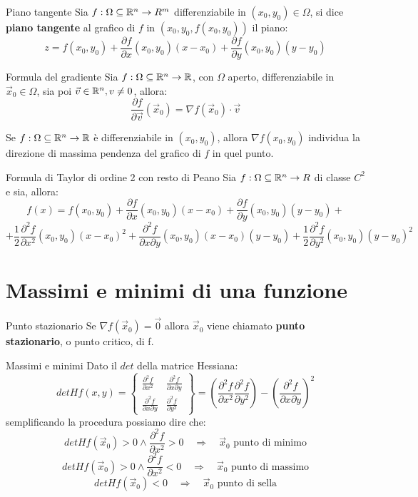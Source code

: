	\begin{definizione}{Piano tangente}
	Sia $f:\Omega \subseteq \mathbb{R}^n \rightarrow R^m$ differenziabile in $(x_0,y_0) \in \Omega$, si dice \textbf{piano tangente} al grafico di $f$ in $(x_0,y_0,f(x_0,y_0))$ il piano:
	$$z=f(x_0,y_0)+\frac{\partial f}{\partial x}(x_0,y_0)(x-x_0)+\frac{\partial f}{\partial y}(x_0,y_0)(y-y_0)$$
  \end{definizione}
	\begin{teorema}{Formula del gradiente}
	Sia $f:\Omega \subseteq \mathbb{R}^n \rightarrow \mathbb{R}$, con $\Omega$ aperto, differenziabile in $\vec x_0 \in \Omega$, sia poi $\vec v \in \mathbb{R}^n, v \ne 0$, allora:
	$$\frac{\partial f}{\partial \vec v}(\vec x_0) = \nabla f(\vec x_0) \cdot \vec v$$
  \end{teorema}
	\begin{teorema}
	Se $f:\Omega \subseteq \mathbb{R}^n \rightarrow \mathbb{R}$ è differenziabile in $(x_0, y_0)$, allora $\nabla f(x_0, y_0)$ individua la direzione di massima pendenza del grafico di $f$ in quel punto.
  \end{teorema}
	\begin{teorema}{Formula di Taylor di ordine 2  con resto di Peano}
	Sia $f:\Omega \subseteq \mathbb{R}^n \rightarrow R$ di classe $C^2$ e sia, allora:
	$$f(x)=f(x_0,y_0)+\frac{\partial f}{\partial x}(x_0,y_0)(x-x_0)+\frac{\partial f}{\partial y}(x_0,y_0)(y-y_0)+$$
	$$+\frac 1 2 \frac{\partial^2 f}{\partial x^2}(x_0,y_0)(x-x_0)^2+\frac{\partial^2 f}{\partial x \partial y}(x_0,y_0)(x-x_0)(y-y_0)+\frac 1 2\frac{\partial^2 f}{\partial y^2}(x_0,y_0)(y-y_0)^2$$
  \end{teorema}


	\section{Massimi e minimi di una funzione}


	\begin{definizione}{Punto stazionario}
	Se $\nabla f (\vec x_0)=\vec 0$ allora $\vec x_0$ viene chiamato \textbf{punto stazionario}, o punto critico, di f.
  \end{definizione}
	\begin{definizione}{Massimi e minimi}
	Dato il $det$ della matrice Hessiana:
	$$detHf(x,y)=\begin{Bmatrix}
		\frac{\partial^2 f}{\partial x^2} & \frac{\partial^2 f}{\partial x \partial y}\\
		\frac{\partial^2 f}{\partial x \partial y} & \frac{\partial^2 f}{\partial y^2}
	\end{Bmatrix}=\left( \frac{\partial^2 f}{\partial x^2} \frac{\partial^2 f}{\partial y^2} \right)- \left(\frac{\partial^2 f}{\partial x \partial y}\right)^2$$
	semplificando la procedura possiamo dire che:
	$$det Hf(\vec x_0)>0 \wedge \frac{\partial^2 f}{\partial x^2}>0 \quad \Rightarrow \quad \vec x_0 \text{ punto di minimo}$$
	$$det Hf(\vec x_0)>0 \wedge \frac{\partial^2 f}{\partial x^2}<0 \quad \Rightarrow \quad \vec x_0 \text{ punto di massimo}$$
	$$det Hf(\vec x_0)<0 \quad \Rightarrow \quad \vec x_0 \text{ punto di sella}$$
  \end{definizione}
